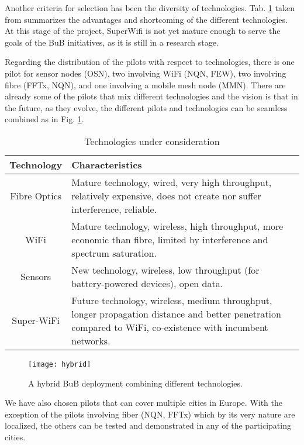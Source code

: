 \documentclass[draftclsnofoot,12pt,journal,onecolumn]{IEEEtran}
\begin{document}
Another criteria for selection has been the diversity of technologies.
Tab. \ref{tab:technologies} taken from \cite{barcelo2012bub} summarizes the advantages and shortcoming of the different technologies.
At this stage of the project, SuperWifi is not yet mature enough to serve the goals of the BuB initiatives, as it is still in a research stage.

Regarding the distribution of the pilots with respect to technologies, there is one pilot for sensor nodes (OSN), two involving WiFi (NQN, FEW), two involving fibre (FFTx, NQN), and one involving a mobile mesh node (MMN).
There are already some of the pilots that mix different technologies and the vision is that in the future, as they evolve, the different pilots and technologies can be seamless combined as in Fig. \ref{fig:hybrid}.

\begin{table}[!t]
\renewcommand{\arraystretch}{1.3}
\caption{Technologies under consideration}
\label{tab:technologies}
\centering
\begin{tabular}{|c|p{5cm}|}
\hline
Technology & Characteristics \\
\hline
Fibre Optics & Mature technology, wired, very high throughput, relatively expensive, does not create nor suffer interference, reliable. \\
WiFi & Mature technology, wireless, high throughput, more economic than fibre, limited by interference and spectrum saturation. \\
Sensors & New technology, wireless, low throughput (for battery-powered devices), open data. \\
Super-WiFi & Future technology, wireless, medium throughput, longer propagation distance and better penetration compared to WiFi, co-existence with incumbent networks.\\
\hline
\end{tabular}
\end{table}


\begin{figure}[!t]
\centering
\texttt{[image: hybrid]}
\caption{A hybrid BuB deployment combining different technologies.}
\label{fig:hybrid}
\end{figure}

We have also chosen pilots that can cover multiple cities in Europe.
With the exception of the pilots involving fiber (NQN, FFTx) which by its very nature are localized, the others can be tested and demonstrated in any of the participating cities.
\end{document}
